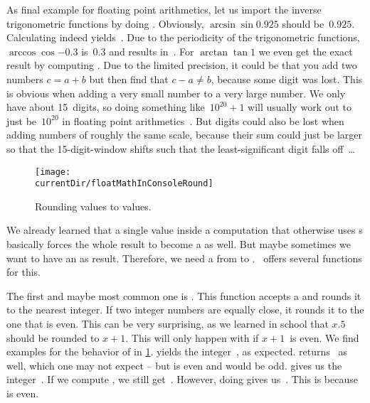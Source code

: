 As final example for floating point arithmetics, let us import the inverse trigonometric functions by doing .
Obviously, $\arcsin{\sin{0.925}}$ should be~$0.925$.
Calculating  indeed yields~.
Due to the periodicity of the trigonometric functions, $\arccos{\cos{-0.3}}$ is~$0.3$ and  results in~.
For $\arctan{\tan{1}}$ we even get the exact result  by computing .%
%
%
%
Due to the limited precision, it could be that you add two numbers $c=a+b$ but then find that $c-a\neq b$, because some digit was lost. %
This is obvious when adding a very small number to a very large number.
We only have about 15~digits, so doing something like~$10^{20} + 1$ will usually work out to just be~$10^{20}$ in floating point arithmetics~\cite{PTVF2007EAAS}.
But digits could also be lost when adding numbers of roughly the same scale, because their sum could just be larger so that the 15-digit-window shifts such that the least-significant digit falls off~\cite{BHK2006NS}{\dots}%
%
\endhsection%
%
%
%
\begin{figure}%
\centering%
\texttt{[image: \\currentDir/floatMathInConsoleRound]}%
\caption{Rounding  values to  values.}%
\label{fig:floatMathInConsoleRound}%
\end{figure}%
%
We already learned that a single  value inside a computation that otherwise uses s basically forces the whole result to become a  as well.
But maybe sometimes we want to have an  as result.
Therefore, we need a  from  to .
\python\ offers several functions for this.

The first and maybe most common one is .
This function accepts a  and rounds it to the nearest integer.
If two integer numbers are equally close, it rounds it to the one that is even.
This can be very surprising, as we learned in school that $x.5$ should be rounded to $x+1$.
This will only happen with  if $x+1$~is even.
We find examples for the behavior of  in \cref{fig:floatMathInConsoleRound}.
 yields the integer~, as expected.
 returns~ as well, which one may not expect -- but  is even and  would be odd.
 gives us the integer~.
If we compute , we still get~.
However, doing  gives us~.
This is because  is even.

